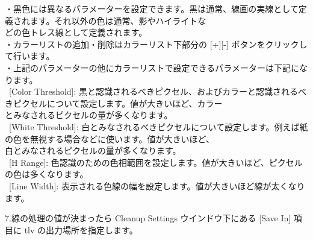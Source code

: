 \documentclass[a4paper,10pt]{article}
\begin{document}
\footnotesize
\noindent ・黒色には異なるパラメーターを設定できます。黒は通常、線画の実線として定義されます。それ以外の色は通常、影やハイライトな\\
どの色トレス線として定義されます。\\
・カラーリストの追加・削除はカラーリスト下部分の [+][-] ボタンをクリックして行います。\\
・上記のパラメーターの他にカラーリストで設定できるパラメーターは下記になります。\\
\ [Color Threshold]: 黒と認識されるべきピクセル、およびカラーと認識されるべきピクセルについて設定します。値が大きいほど、カラー\\
とみなされるピクセルの量が多くなります。\\
\ [White Threshold]: 白とみなされるべきピクセルについて設定します。例えば紙の色を無視する場合などに使います。値が大きいほど、\\
白とみなされるピクセルの量が多くなります。\\
\ [H Range]: 色認識のための色相範囲を設定します。値が大きいほど、ピクセルの色は多くなります。\\
\ [Line Width]: 表示される色線の幅を設定します。値が大きいほど線が太くなります。\\
\par
\small
\noindent 7.線の処理の値が決まったら Cleanup Settings ウインドウ下にある [Save In] 項目に tlv の出力場所を指定します。\\

\newpage 
\end{document}
